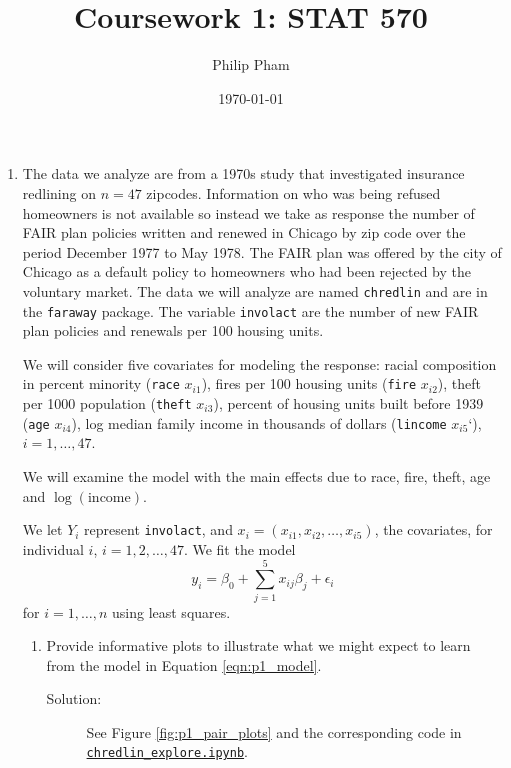 \documentclass[letterpaper,11pt]{article}
\title{Coursework 1: STAT 570}
\author{Philip Pham}
\date{\today}
\begin{document}
\maketitle

\begin{enumerate}
\item The data we analyze are from a 1970s study that investigated insurance
  redlining on $n = 47$ zipcodes. Information on who was being refused
  homeowners is not available so instead we take as response the number of FAIR
  plan policies written and renewed in Chicago by zip code over the period
  December 1977 to May 1978. The FAIR plan was offered by the city of Chicago as
  a default policy to homeowners who had been rejected by the voluntary market.
  The data we will analyze are named \texttt{chredlin} and are in the
  \texttt{faraway} package. The variable \texttt{involact} are the number of new
  FAIR plan policies and renewals per 100 housing units.

  We will consider five covariates for modeling the response: racial composition
  in percent minority (\texttt{race} $x_{i1}$), fires per 100 housing units
  (\texttt{fire} $x_{i2}$), theft per 1000 population (\texttt{theft} $x_{i3}$),
  percent of housing units built before 1939 (\texttt{age} $x_{i4}$), log
  median family income in thousands of dollars (\texttt{lincome} $x_{i5}$`),
  $i = 1,\ldots,47$.

  We will examine the model with the main effects due to race, fire, theft, age
  and $\log(\mathrm{income})$.

  We let $Y_i$ represent \texttt{involact}, and
  $x_i = \left(x_{i1}, x_{i2}, \ldots, x_{i5}\right)$, the covariates, for
  individual $i$, $i = 1,2,\ldots,47$. We fit the model
  \begin{equation}
    y_i = \beta_0 + \sum_{j=1}^5x_{ij}\beta_j + \epsilon_i
    \label{eqn:p1_model}
  \end{equation}
  for $i=1,\ldots,n$ using least squares.

  \begin{enumerate}
  \item Provide informative plots to illustrate what we might expect to learn
    from the model in Equation \ref{eqn:p1_model}.

    \begin{description}
    \item[Solution:] See Figure \ref{fig:p1_pair_plots} and the corresponding
      code in
      \href{https://nbviewer.jupyter.org/github/ppham27/stat570/blob/master/hw1/chredlin\_explore.ipynb}{\texttt{chredlin\_explore.ipynb}}.


\end{description}
\end{enumerate}
\end{enumerate}
\end{document}
